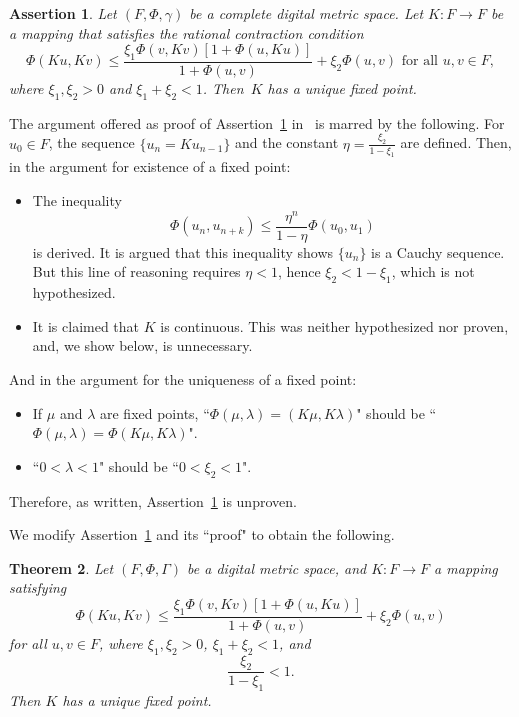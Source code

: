 \documentclass{article}
\newtheorem{thm}{Theorem}
\newtheorem{assert}[thm]{Assertion}
\numberwithin{thm}{section}
\begin{document}
\begin{assert}
   \label{SalJh3}
   Let $(F,\Phi,\gamma)$ be a complete digital metric space.
   Let $K: F \to F$ be a mapping that satisfies the 
   rational contraction condition
   \[ \Phi(Ku,Kv) \le \frac{\xi_1 \Phi(v,Kv)[1 + \Phi(u,Ku)]}{1 + \Phi(u,v)} + \xi_2 \Phi(u,v) \mbox{ for all }
   u,v \in F,
   \]
   where $\xi_1, \xi_2 > 0$ and $\xi_1 + \xi_2 < 1$.
   Then~$K$ has a unique fixed point.
\end{assert}

The argument offered as proof of Assertion~\ref{SalJh3}
in~\cite{SalJh} is marred by the following.
For $u_0 \in F$, the sequence $\{u_n = Ku_{n-1}\}$ 
and the constant $\eta = \frac{\xi_2}{1 - \xi_1}$
are defined. Then, in the argument for existence of a fixed
point:
\begin{itemize}
    \item The inequality
    \[ \Phi (u_n, u_{n+k}) \le \frac{\eta ^ n}{1-\eta} \Phi(u_0,u_1)
    \]
    is derived. It is argued that this inequality 
    shows $\{ u_n \}$ is a Cauchy sequence. But this
    line of reasoning requires $\eta < 1$, hence
    $\xi_2 < 1 - \xi_1$, which is not hypothesized.
    \item It is claimed that $K$ is continuous. This was
    neither hypothesized nor proven, and, we show below,
    is unnecessary.
\end{itemize}
And in the argument for the uniqueness of a fixed point:
\begin{itemize}
    \item If $\mu$ and $\lambda$ are fixed points,
          ``$\Phi(\mu, \lambda) = (K \mu, K \lambda)$"
          should be
          ``$\Phi(\mu, \lambda) = \Phi(K \mu, K \lambda)$".
    \item ``$0 < \lambda < 1$" should be
          ``$0 < \xi_2 < 1$".
\end{itemize}
Therefore, as written, Assertion~\ref{SalJh3} is unproven.

We modify Assertion~\ref{SalJh3} and its ``proof"
to obtain the following.

\begin{thm}
    {\rm \cite{SalJh}}
    Let $(F,\Phi,\Gamma)$
    be a digital metric
    space, and
    $K: F \to F$ a
    mapping satisfying
    \begin{equation}
        \label{SalJh(1)}
        \Phi(Ku,Kv) \le
        \frac{\xi_1 \Phi(v,Kv) [1+ \Phi(u,Ku)]}{1+\Phi(u,v)} +
        \xi_2 \Phi(u,v)
    \end{equation}
    for all $u,v \in F$, where
    $\xi_1, \xi_2 > 0$,
    $\xi_1 + \xi_2 < 1$,
    and
    \begin{equation}
        \label{SalJhAddon}
        \frac{\xi_2}{1-\xi_1} < 1.
    \end{equation}
    Then $K$ has a unique fixed point.
\end{thm}
\end{document}
